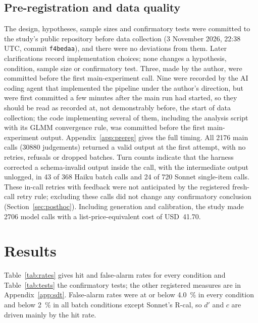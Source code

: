 \documentclass[manuscript, screen, review]{jair}
\newcommand{\code}[1]{\texttt{#1}}
\begin{document}
\subsection{Pre-registration and data quality}\label{sec:prereg}

The design, hypotheses, sample sizes and confirmatory tests were committed to the study's public repository before data collection (3 November 2026, 22:38 UTC, commit \code{f4bedaa}), and there were no deviations from them. Later clarifications record implementation choices; none changes a hypothesis, condition, sample size or confirmatory test. Three, made by the author, were committed before the first main-experiment call. Nine were recorded by the AI coding agent that implemented the pipeline under the author's direction, but were first committed a few minutes after the main run had started, so they should be read as recorded at, not demonstrably before, the start of data collection; the code implementing several of them, including the analysis script with its GLMM convergence rule, was committed before the first main-experiment output. Appendix~\ref{app:prereg} gives the full timing. All \num{2176} main calls (\num{30880} judgements) returned a valid output at the first attempt, with no retries, refusals or dropped batches. Turn counts indicate that the harness corrected a schema-invalid output inside the call, with the intermediate output unlogged, in 43 of 368 Haiku batch calls and 24 of 720 Sonnet single-item calls. These in-call retries with feedback were not anticipated by the registered fresh-call retry rule; excluding these calls did not change any confirmatory conclusion (Section~\ref{sec:posthoc}). Including generation and calibration, the study made \num{2706} model calls with a list-price-equivalent cost of USD~41.70.

\section{Results}\label{sec:results}

Table~\ref{tab:rates} gives hit and false-alarm rates for every condition and Table~\ref{tab:tests} the confirmatory tests; the other registered measures are in Appendix~\ref{app:sdt}. False-alarm rates were at or below \SI{4.0}{\percent} in every condition and below \SI{2}{\percent} in all batch conditions except Sonnet's R-cal, so $d'$ and $c$ are driven mainly by the hit rate.
\end{document}
